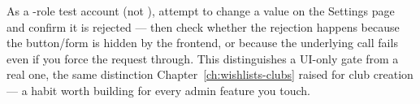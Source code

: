 \begin{olktask}
As a -role test account (not ), attempt to change a value on the Settings page and confirm it is rejected — then check whether the rejection happens because the button/form is hidden by the frontend, or because the underlying  call fails  even if you force the request through. This distinguishes a UI-only gate from a real one, the same distinction Chapter~\ref{ch:wishlists-clubs} raised for club creation — a habit worth building for every admin feature you touch.
\end{olktask}
